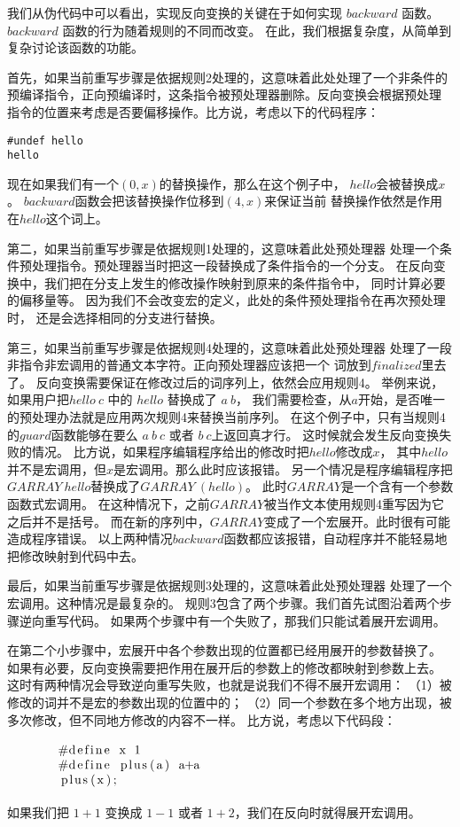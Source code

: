 我们从伪代码中可以看出，实现反向变换的关键在于如何实现 $backward$ 函数。
$backward$ 函数的行为随着规则的不同而改变。
在此，我们根据复杂度，从简单到复杂讨论该函数的功能。

首先，如果当前重写步骤是依据规则2处理的，这意味着此处处理了一个非条件的
预编译指令，正向预编译时，这条指令被预处理器删除。反向变换会根据预处理
指令的位置来考虑是否要偏移操作。比方说，考虑以下的代码程序：
\begin{lstlisting}
#undef hello
hello
\end{lstlisting}
现在如果我们有一个$(0, x)$的替换操作，那么在这个例子中，
$hello$会被替换成$x$。
$backward$函数会把该替换操作位移到$(4, x)$来保证当前
替换操作依然是作用在$hello$这个词上。

第二，如果当前重写步骤是依据规则1处理的，这意味着此处预处理器
处理一个条件预处理指令。预处理器当时把这一段替换成了条件指令的一个分支。
在反向变换中，我们把在分支上发生的修改操作映射到原来的条件指令中，
同时计算必要的偏移量等。
因为我们不会改变宏的定义，此处的条件预处理指令在再次预处理时，
还是会选择相同的分支进行替换。

第三，如果当前重写步骤是依据规则4处理的，这意味着此处预处理器
处理了一段非指令非宏调用的普通文本字符。正向预处理器应该把一个
词放到$finalized$里去了。
反向变换需要保证在修改过后的词序列上，依然会应用规则4。
举例来说，如果用户把$hello\ c$ 中的 $hello$ 替换成了 $a\ b$，
我们需要检查，从$a$开始，是否唯一的预处理办法就是应用两次规则4来替换当前序列。
在这个例子中，只有当规则4的$guard$函数能够在要么 $a\ b\ c$ 或者 $b\ c$上返回真才行。
这时候就会发生反向变换失败的情况。
比方说，如果程序编辑程序给出的修改时把$hello$修改成$x$，
其中$hello$并不是宏调用，但$x$是宏调用。那么此时应该报错。
另一个情况是程序编辑程序把$GARRAY\ hello$替换成了$GARRAY\ (hello)$。
此时$GARRAY$是一个含有一个参数函数式宏调用。
在这种情况下，之前$GARRAY$被当作文本使用规则4重写因为它之后并不是括号。
而在新的序列中，$GARRAY$变成了一个宏展开。此时很有可能造成程序错误。
以上两种情况$backward$函数都应该报错，自动程序并不能轻易地把修改映射到代码中去。


最后，如果当前重写步骤是依据规则3处理的，这意味着此处预处理器
处理了一个宏调用。这种情况是最复杂的。
规则3包含了两个步骤。我们首先试图沿着两个步骤逆向重写代码。
如果两个步骤中有一个失败了，那我们只能试着展开宏调用。

在第二个小步骤中，宏展开中各个参数出现的位置都已经用展开的参数替换了。
如果有必要，反向变换需要把作用在展开后的参数上的修改都映射到参数上去。
这时有两种情况会导致逆向重写失败，也就是说我们不得不展开宏调用：
（1）被修改的词并不是宏的参数出现的位置中的；
（2）同一个参数在多个地方出现，被多次修改，但不同地方修改的内容不一样。
比方说，考虑以下代码段：
\begin{equation}\label{eqn:expansion}
  \begin{minipage}{0.8\columnwidth}
\begin{lstlisting}
#define x 1
#define plus(a) a+a
plus(x);
\end{lstlisting}
  \end{minipage}
\end{equation}
如果我们把 $1+1$ 变换成 $1-1$ 或者 $1+2$，我们在反向时就得展开宏调用。

